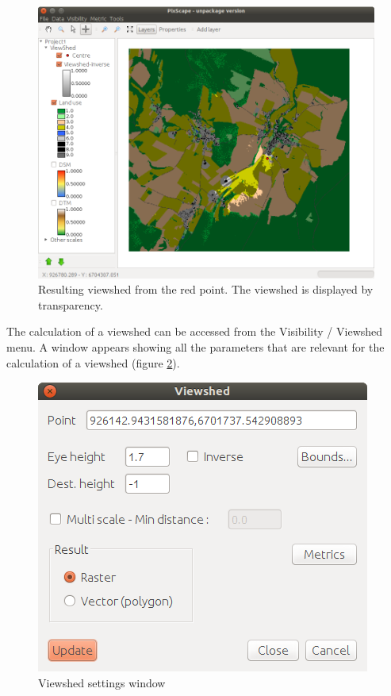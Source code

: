 \documentclass{report}
\begin{document}
\begin{figure}[H]
	\includegraphics[scale=0.5]{img/viewshed-en.png} 
	\caption{Resulting viewshed from the red point. The viewshed is displayed by transparency.}
	\label{viewshed}
\end{figure}

The calculation of a viewshed can be accessed from the Visibility / Viewshed menu. A window appears showing all the parameters that are relevant for the calculation of a viewshed (figure \ref{viewshed_param_fig}).

\begin{figure}[H]
	\includegraphics[scale=0.5]{img/viewshed_dlg-en.png} 
	\caption{Viewshed settings window}
	\label{viewshed_param_fig}
\end{figure}
\end{document}
